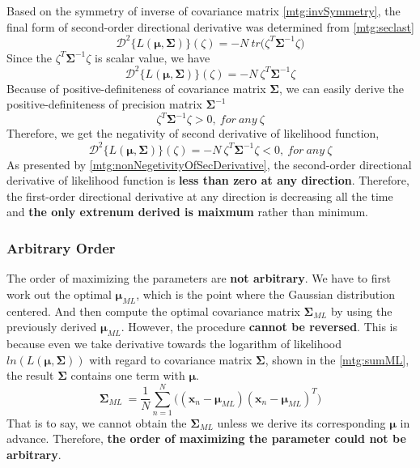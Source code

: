 \documentclass[11pt,a4paper]{article}
\newcommand{\htab}{\hspace*{0.63cm}}
\newcommand{\ddt}[2]{\mathcal{D}^{2}\{ #1 \} (#2)}
\newcommand{\bmu}{\boldsymbol{\mu}}
\newcommand{\bsum}{\boldsymbol{\Sigma}}
\newcommand{\xnv}{\boldsymbol{x}_{n} }
\begin{document}
\htab Based on the symmetry of inverse of covariance matrix \eqref{mtg:invSymmetry},
the final form of second-order directional derivative was determined from \eqref{mtg:seclast}
    \begin{equation} 
        \ddt {L(\bmu,\bsum)}{\zeta} 
         = -N\ tr \Big(  \zeta^{T} \bsum^{-1} \zeta \Big)
    \end{equation}
\htab Since the $\zeta^{T} \bsum^{-1} \zeta$ is scalar value, we have
    \begin{equation} 
        \ddt {L(\bmu,\bsum)}{\zeta} 
         = -N\ \zeta^{T} \bsum^{-1} \zeta
    \end{equation}
\htab Because of positive-definiteness of covariance matrix $\bsum$, we can easily derive the positive-definiteness of precision matrix $\bsum^{-1}$
    \begin{equation} 
        \zeta^{T} \bsum^{-1} \zeta > 0,\ for\ any\ \zeta
    \end{equation}
\htab Therefore, we get the negativity of second derivative of likelihood function, 
\begin{equation} \label{mtg:nonNegetivityOfSecDerivative}
        \ddt {L(\bmu,\bsum)}{\zeta} 
         = -N\ \zeta^{T} \bsum^{-1} \zeta  < 0 ,\ for\ any\ \zeta
    \end{equation}
\htab As presented by \eqref{mtg:nonNegetivityOfSecDerivative}, the second-order directional derivative of likelihood function is \textbf{less than zero at any direction}. Therefore, the first-order directional derivative at any direction is decreasing all the time and \textbf{the only extrenum derived is maixmum} rather than minimum.
\subsubsection{Arbitrary Order}
\htab The order of maximizing the parameters are \textbf{not arbitrary}. We have to first work out the optimal $\bmu_{ML}$, which is the point where the Gaussian distribution centered. And then compute the optimal covariance matrix $\bsum_{ML}$ by using the previously derived $\bmu_{ML}$. However, the procedure \textbf{cannot be reversed}. This is because even we take derivative towards the logarithm of likelihood $ln (L(\bmu,\bsum))$ with regard to covariance matrix $\bsum$, shown in the \eqref{mtg:sumML}, the result $\bsum$ contains one term with $\bmu$. 
    \begin{equation}  
        \bsum_{ML} \
        = \frac{1}{N}  \sum_{n=1}^{N} \Big( (\xnv - \bmu_{ML})  (\xnv - \bmu_{ML})^{T} \Big)
    \end{equation}
\htab That is to say, we cannot obtain the $\bsum_{ML}$ unless we derive its corresponding $\bmu$ in advance. Therefore, \textbf{the order of maximizing the parameter could not be arbitrary}.
\end{document}
